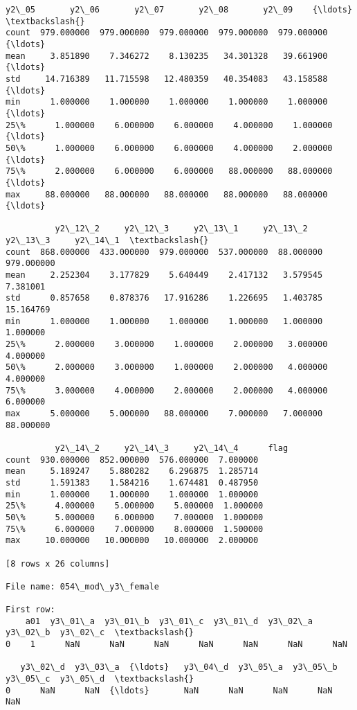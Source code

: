 \documentclass[11pt]{article}
\begin{document}
\begin{Verbatim}[commandchars=\\\{\}]
            y2\_05       y2\_06       y2\_07       y2\_08       y2\_09    {\ldots}     \textbackslash{}
count  979.000000  979.000000  979.000000  979.000000  979.000000    {\ldots}      
mean     3.851890    7.346272    8.130235   34.301328   39.661900    {\ldots}      
std     14.716389   11.715598   12.480359   40.354083   43.158588    {\ldots}      
min      1.000000    1.000000    1.000000    1.000000    1.000000    {\ldots}      
25\%      1.000000    6.000000    6.000000    4.000000    1.000000    {\ldots}      
50\%      1.000000    6.000000    6.000000    4.000000    2.000000    {\ldots}      
75\%      2.000000    6.000000    6.000000   88.000000   88.000000    {\ldots}      
max     88.000000   88.000000   88.000000   88.000000   88.000000    {\ldots}      

          y2\_12\_2     y2\_12\_3     y2\_13\_1     y2\_13\_2    y2\_13\_3     y2\_14\_1  \textbackslash{}
count  868.000000  433.000000  979.000000  537.000000  88.000000  979.000000   
mean     2.252304    3.177829    5.640449    2.417132   3.579545    7.381001   
std      0.857658    0.878376   17.916286    1.226695   1.403785   15.164769   
min      1.000000    1.000000    1.000000    1.000000   1.000000    1.000000   
25\%      2.000000    3.000000    1.000000    2.000000   3.000000    4.000000   
50\%      2.000000    3.000000    1.000000    2.000000   4.000000    4.000000   
75\%      3.000000    4.000000    2.000000    2.000000   4.000000    6.000000   
max      5.000000    5.000000   88.000000    7.000000   7.000000   88.000000   

          y2\_14\_2     y2\_14\_3     y2\_14\_4      flag  
count  930.000000  852.000000  576.000000  7.000000  
mean     5.189247    5.880282    6.296875  1.285714  
std      1.591383    1.584216    1.674481  0.487950  
min      1.000000    1.000000    1.000000  1.000000  
25\%      4.000000    5.000000    5.000000  1.000000  
50\%      5.000000    6.000000    7.000000  1.000000  
75\%      6.000000    7.000000    8.000000  1.500000  
max     10.000000   10.000000   10.000000  2.000000  

[8 rows x 26 columns]

File name: 054\_mod\_y3\_female

First row: 
    a01  y3\_01\_a  y3\_01\_b  y3\_01\_c  y3\_01\_d  y3\_02\_a  y3\_02\_b  y3\_02\_c  \textbackslash{}
0    1      NaN      NaN      NaN      NaN      NaN      NaN      NaN   

   y3\_02\_d  y3\_03\_a  {\ldots}   y3\_04\_d  y3\_05\_a  y3\_05\_b  y3\_05\_c  y3\_05\_d  \textbackslash{}
0      NaN      NaN  {\ldots}       NaN      NaN      NaN      NaN      NaN   


\end{Verbatim}
\end{document}
